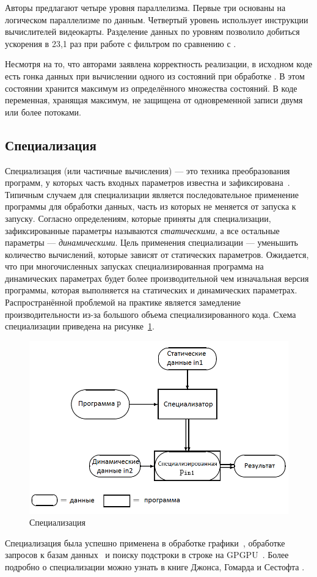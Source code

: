 Авторы предлагают четыре уровня параллелизма.
Первые три основаны на логическом параллелизме по данным.
Четвертый уровень использует  инструкции 
вычислителей видеокарты.
Разделение данных по уровням позволило добиться ускорения в 
23,1 раз при работе с фильтром  по сравнению с
.

Несмотря на то, что авторами заявлена корректность 
реализации, в исходном коде есть гонка данных при вычислении 
одного из состояний при обработке .
В этом состоянии хранится максимум из определённого множества состояний.
В коде  переменная, хранящая максимум, 
не защищена от одновременной записи двумя или более потоками.

\subsection{Специализация}
Специализация (или частичные вычисления) --- это техника 
преобразования программ, у которых часть входных параметров
известна и зафиксирована~\cite{Jones_spec}.
Типичным случаем для специализации является последовательное 
применение программы для обработки данных, часть из которых 
не меняется от запуска к запуску.
Согласно определениям, которые приняты для специализации, 
зафиксированные параметры называются \emph{статическими}, а 
все остальные параметры --- \emph{динамическими}.
Цель применения специализации --- уменьшить количество 
вычислений, которые зависят от статических параметров.
Ожидается, что при многочисленных запусках специализированная 
программа на динамических параметрах будет более 
производительной чем изначальная версия программы, которая 
выполняется на статических и динамических параметрах.
Распространённой проблемой на практике является замедление 
производительности из-за большого объема специализированного
кода.
Схема специализации приведена на рисунке~\ref{spec}.
\begin{figure}[h!]
  \centering
  \includegraphics[width=\columnwidth]{spec.png}
  \caption{Специализация~\cite{Jones_spec}}
  \label{spec}
\end{figure}

Специализация была успешно применена в обработке 
графики~\cite{RT_spec}, обработке запросов к базам 
данных~\cite{SQL_spec} и поиску подстроки в строке на 
GPGPU~\cite{part_eval_GPU}.
Более подробно о специализации можно узнать в книге Джонса, 
Гомарда и Сестофта \cite{Jones_spec}.